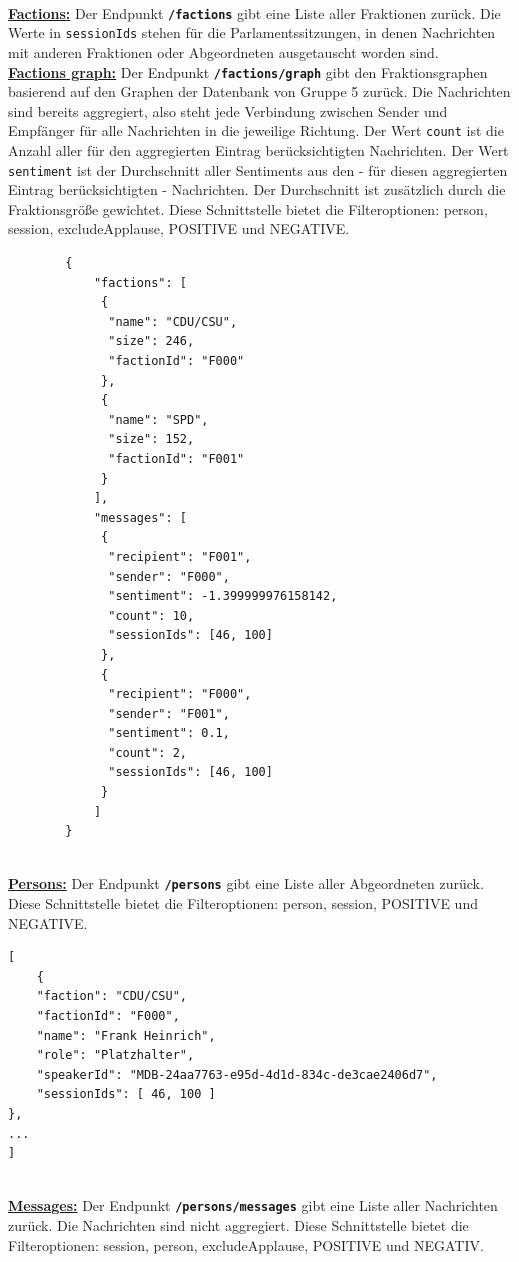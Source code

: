 ~\\	
\textbf{\underline{Factions:}} 
\newline
Der Endpunkt \textbf{\texttt{/factions}} gibt eine Liste aller Fraktionen zurück. Die Werte in \texttt{sessionIds} stehen für die Parlamentssitzungen, in denen Nachrichten mit anderen Fraktionen oder Abgeordneten ausgetauscht worden sind.
\newpage
~\\		
\textbf{\underline{Factions graph:}} \newline
Der Endpunkt \textbf{\texttt{/factions/graph}} gibt den Fraktionsgraphen basierend auf den Graphen der Datenbank von Gruppe 5 zurück. Die Nachrichten sind bereits aggregiert, also steht jede Verbindung zwischen Sender und Empfänger für alle Nachrichten in die jeweilige Richtung. Der Wert \texttt{count} ist die Anzahl aller für den aggregierten Eintrag berücksichtigten Nachrichten. Der Wert \texttt{sentiment} ist der Durchschnitt aller Sentiments aus den - für diesen aggregierten Eintrag berücksichtigten - Nachrichten. Der Durchschnitt ist zusätzlich durch die Fraktionsgröße gewichtet. Diese Schnittstelle bietet die Filteroptionen: person, session, excludeApplause, POSITIVE und NEGATIVE.	
\begin{lstlisting}
		{
			"factions": [
			 {
			  "name": "CDU/CSU",
			  "size": 246, 
			  "factionId": "F000"
			 },
			 {
			  "name": "SPD",
			  "size": 152,
			  "factionId": "F001"
			 }
			],
			"messages": [
			 {
			  "recipient": "F001",
			  "sender": "F000",
			  "sentiment": -1.399999976158142,
			  "count": 10,
			  "sessionIds": [46, 100]
			 },
			 {
			  "recipient": "F000",
			  "sender": "F001",
			  "sentiment": 0.1,
			  "count": 2,
			  "sessionIds": [46, 100]
			 }
			]
		}
\end{lstlisting}
\newpage
~\\	
\textbf{\underline{Persons:}}\newline
Der Endpunkt \textbf{\texttt{/persons}} gibt eine Liste aller Abgeordneten zurück. Diese Schnittstelle bietet die Filteroptionen: person, session, POSITIVE und NEGATIVE.
\begin{lstlisting}
[
    {
    "faction": "CDU/CSU",
    "factionId": "F000", 
    "name": "Frank Heinrich", 
    "role": "Platzhalter", 
    "speakerId": "MDB-24aa7763-e95d-4d1d-834c-de3cae2406d7",
    "sessionIds": [ 46, 100 ]
}, 
...
]
\end{lstlisting}
~\\
\textbf{\underline{Messages:}}\newline
Der Endpunkt \textbf{\texttt{/persons/messages}} gibt eine Liste aller Nachrichten zurück. Die Nachrichten sind nicht aggregiert. Diese Schnittstelle bietet die Filteroptionen: session, person, excludeApplause, POSITIVE und NEGATIV.	
